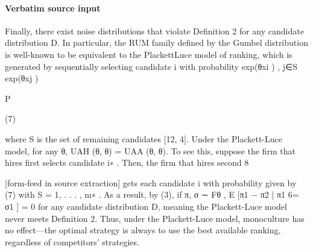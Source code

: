 \documentclass[10pt]{article}
\begin{document}
\paragraph{Verbatim source input}
\begin{ReviewVerbatim}
Finally, there exist noise distributions that violate Definition 2 for any candidate distribution D. In
particular, the RUM family defined by the Gumbel distribution is well-known to be equivalent to the PlackettLuce model of ranking, which is generated by sequentially selecting candidate i with probability
exp(θxi )
,
j∈S exp(θxj )

P

(7)

where S is the set of remaining candidates [12, 4]. Under the Plackett-Luce model, for any θ, UAH (θ, θ) =
UAA (θ, θ). To see this, suppose the firm that hires first selects candidate i∗ . Then, the firm that hires second
8


[form-feed in source extraction]
gets each candidate i with probability given by (7) with S = {1, . . . , n}\i∗ . As a result, by (3), if π, σ ∼ Fθ ,
E [π1 − π2 | π1 6= σ1 ] = 0
for any candidate distribution D, meaning the Plackett-Luce model never meets Definition 2. Thus, under
the Plackett-Luce model, monoculture has no effect—the optimal strategy is always to use the best available
ranking, regardless of competitors’ strategies.
\end{ReviewVerbatim}
\end{document}
